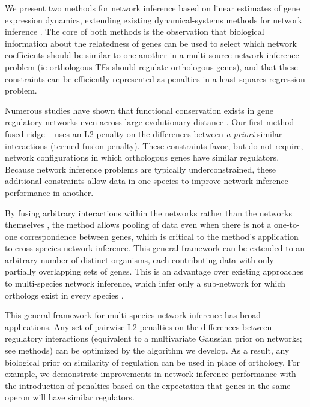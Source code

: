 \documentclass[11pt]{article}
\begin{document}
We present two methods for network inference based on linear estimates of gene expression dynamics, extending existing dynamical-systems methods for network inference \cite{bonneau_predictive_2007, arrieta-ortiz_experimentally_2015, yeung_reverse_2002}. The core of both methods is the observation that biological information about the relatedness of genes can be used to select which network coefficients should be similar to one another in a multi-source network inference problem (ie orthologous TFs should regulate orthologous genes), and that these constraints can be efficiently represented as penalties in a least-squares regression problem. 

Numerous studies have shown that functional conservation exists in gene regulatory networks even across large evolutionary distance \cite{satou2006gene, hinman2009evolution,tanay2005conservation,erwin2009evolution}. Our first method -- fused ridge -- uses an L2 penalty on the differences between \textit{a priori} similar interactions (termed fusion penalty). These constraints favor, but do not require, network configurations in which orthologous genes have similar regulators. Because network inference problems are typically underconstrained, these additional constraints allow data in one species to improve network inference performance in another.

By fusing arbitrary interactions within the networks rather than the networks themselves \cite{}, the method allows pooling of data even when there is not a one-to-one correspondence between genes, which is critical to the method's application to cross-species network inference. This general framework can be extended to an arbitrary number of distinct organisms, each contributing data with only partially overlapping sets of genes. This is an advantage over existing approaches to multi-species network inference, which infer only a sub-network for which orthologs exist in every species \cite{joshi_multi-species_2015}. 

This general framework for multi-species network inference has broad applications. Any set of pairwise L2 penalties on the differences between regulatory interactions (equivalent to a multivariate Gaussian prior on networks; see methods) can be optimized by the algorithm we develop. As a result, any biological prior on similarity of regulation can be used in place of orthology. For example, we demonstrate improvements in network inference performance with the introduction of penalties based on the expectation that genes in the same operon will have similar regulators.
\end{document}
